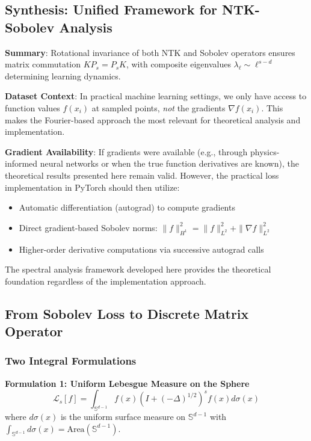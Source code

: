 \documentclass[a4paper]{article}
\begin{document}
\subsection{Synthesis: Unified Framework for NTK-Sobolev Analysis}

\textbf{Summary}: Rotational invariance of both NTK and Sobolev operators ensures matrix commutation $KP_s = P_sK$, with composite eigenvalues $\lambda_\ell \sim \ell^{s-d}$ determining learning dynamics.

\begin{remark}
\textbf{Dataset Context}: In practical machine learning settings, we only have access to function values $f(x_i)$ at sampled points, \emph{not} the gradients $\nabla f(x_i)$. This makes the Fourier-based approach the most relevant for theoretical analysis and implementation.

\textbf{Gradient Availability}: If gradients were available (e.g., through physics-informed neural networks or when the true function derivatives are known), the theoretical results presented here remain valid. However, the practical loss implementation in PyTorch should then utilize:
\begin{itemize}
\item Automatic differentiation (autograd) to compute gradients
\item Direct gradient-based Sobolev norms: $\|f\|_{H^1}^2 = \|f\|_{L^2}^2 + \|\nabla f\|_{L^2}^2$
\item Higher-order derivative computations via successive autograd calls
\end{itemize}

The spectral analysis framework developed here provides the theoretical foundation regardless of the implementation approach.
\end{remark}

\subsection{From Sobolev Loss to Discrete Matrix Operator}

\subsubsection{Two Integral Formulations}

\textbf{Formulation 1: Uniform Lebesgue Measure on the Sphere}
\[ \mathcal{L}_s[f] = \int_{\mathbb{S}^{d-1}} f(x) (I + (-\Delta)^{1/2})^s f(x) d\sigma(x) \]
where $d\sigma(x)$ is the uniform surface measure on $\mathbb{S}^{d-1}$ with $\int_{\mathbb{S}^{d-1}} d\sigma(x) = \text{Area}(\mathbb{S}^{d-1})$.
\end{document}
